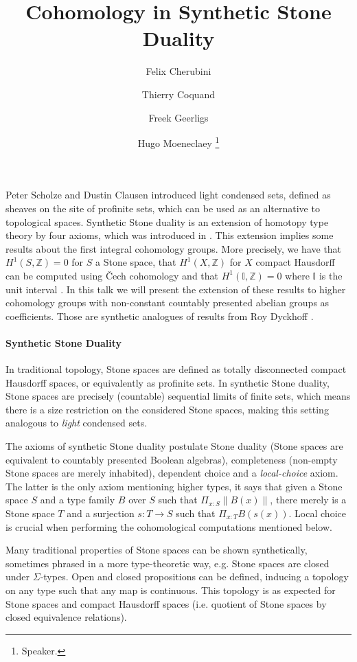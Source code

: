\documentclass[letterpaper]{../util/easychair}
\title{Cohomology in Synthetic Stone Duality 
}
\author{
Felix Cherubini %
\and 
 Thierry Coquand%
\and 
 Freek Geerligs%
\and
 Hugo Moeneclaey %
\thanks{Speaker.}%
}
\institute{
  University of Gothenburg and Chalmers University of Technology, Gothenburg, Sweden%
}
\newcommand{\Z}{\mathbb{Z}}
\begin{document}
\maketitle
Peter Scholze and Dustin Clausen \cite{Scholze} introduced light condensed sets, defined as sheaves on the site of profinite sets, which can be used as an alternative to topological spaces. 
Synthetic Stone duality is an extension of homotopy type theory by four axioms, which was introduced in \cite{synthetic-stone-duality}. This extension implies some results about the first integral cohomology groups. More precisely, we have that $H^1(S,\Z) = 0$ for $S$ a Stone space, that $H^1(X,\Z)$ for $X$ compact Hausdorff can be computed using \v{C}ech cohomology and that $H^1(\mathbb{I},\Z) = 0$ where $\mathbb{I}$ is the unit interval \cite{synthetic-stone-duality}. In this talk we will present the extension of these results to higher cohomology groups with non-constant countably presented abelian groups as coefficients. Those are synthetic analogues of results from Roy Dyckhoff \cite{dyckhoff76,dyckhoff76-1}.

\paragraph*{Synthetic Stone Duality}

In traditional topology, Stone spaces are defined as totally disconnected compact Hausdorff spaces, or equivalently as profinite sets. In synthetic Stone duality, Stone spaces are precisely (countable) sequential limits of finite sets, which means there is a size restriction on the considered Stone spaces, making this setting analogous to \emph{light} condensed sets. 

The axioms of synthetic Stone duality postulate Stone duality (Stone spaces are equivalent to countably presented Boolean algebras), completeness (non-empty Stone spaces are merely inhabited), dependent choice and a \emph{local-choice} axiom. The latter is the only axiom mentioning higher types, it says that given a Stone space $S$ and a type family $B$ over $S$ such that $\Pi_{x:S} \| B(x)  \|$, there merely is a Stone space $T$ and a surjection $s:T\to S$ such that $\Pi_{x:T} B(s(x))$. Local choice is crucial when performing the cohomological computations mentioned below.

Many traditional properties of Stone spaces can be shown synthetically, sometimes phrased in a more type-theoretic way, e.g. Stone spaces are closed under $\Sigma$-types. Open and closed propositions can be defined, inducing a topology on any type such that any map is continuous. This topology is as expected for Stone spaces and compact Hausdorff spaces (i.e. quotient of Stone spaces by closed equivalence relations).
\end{document}
